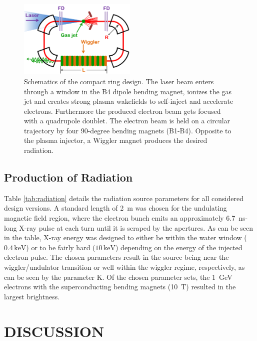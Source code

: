 \documentclass[a4paper,
              ]{jacow}
\begin{document}
\begin{figure}
\includegraphics[width = 0.5\textwidth]{on-orbit-laser-plasma-2.png}
\caption{Schematics of the compact ring design. The laser beam enters through a window in the B4 dipole bending magnet, ionizes the gas jet and creates strong plasma wakefields to self-inject and accelerate electrons. Furthermore the produced electron beam gets focused with a quadrupole doublet. The electron beam is held on a circular trajectory by four 90-degree bending magnets (B1-B4). Opposite to the plasma injector, a Wiggler magnet produces the desired radiation.}
	\label{schematics}
\end{figure}

\subsection{Production of Radiation}
\label{radiation}
Table \ref{tab:radiation} details the radiation source parameters for all considered design versions.  A standard length of \SI{2}{m} was chosen for the undulating magnetic field region, where the electron bunch emits an approximately \SI{6.7}{ns}-long X-ray pulse at each turn until it is scraped by the apertures. As can be seen in the table, X-ray energy was designed to either be within the water window ($0.4\,\text{keV}$) or to be fairly hard ($10\,\text{keV}$) depending on the energy of the injected electron pulse.  The chosen parameters result in the source being near the wiggler/undulator transition or well within the wiggler regime, respectively, as can be seen by the parameter K.  Of the chosen parameter sets, the \SI{1}{GeV} electrons with the superconducting bending magnets (\SI{10}{T}) resulted in the largest brightness.




\section{DISCUSSION}
\end{document}
